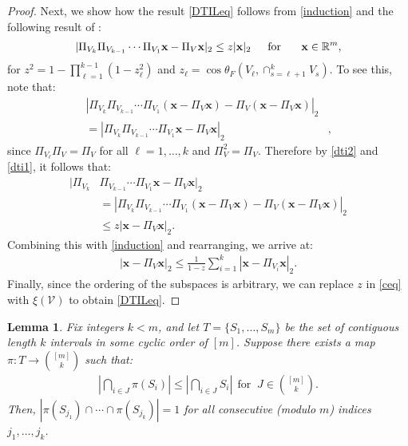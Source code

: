 \documentclass[journal, twocolumn]{IEEEtran}
\newtheorem{lemma}{Lemma}
\begin{document}
\begin{proof}
Next, we show how the result \eqref{DTILeq} follows from \eqref{induction} and the following result of \cite[Thm.~9.33]{Deutsch12}:
\begin{align}\label{dti2}
|\Pi_{V_k}\Pi_{V_{k-1}}\cdots\Pi_{V_1} \mathbf{x} - \Pi_V\mathbf{x}|_2 \leq z |\mathbf{x}|_2 \indent \text{for } \indent \mathbf{x} \in \mathbb{R}^m,
\end{align}
for \mbox{$z^2= 1 - \prod_{\ell =1}^{k-1}(1-z_{\ell}^2)$} and \mbox{$z_{\ell} = \cos\theta_F\left(V_{\ell}, \cap_{s=\ell+1}^k V_s\right)$}. 
To see this, note that:
\begin{align}\label{dti1}
|\Pi_{V_k}\Pi_{V_{k-1}}\cdots\Pi_{V_1}(\mathbf{x} - \Pi_V\mathbf{x}) - \Pi_V(\mathbf{x} - \Pi_V\mathbf{x})|_2& \\
= |\Pi_{V_k}\Pi_{V_{k-1}}\cdots\Pi_{V_1} \mathbf{x} - \Pi_V \mathbf{x} |_2&,
\end{align}
since $\Pi_{V_\ell} \Pi_V = \Pi_V$ for all $\ell = 1, \ldots, k$ and $\Pi_V^2 = \Pi_V$.
Therefore by \eqref{dti2} and \eqref{dti1}, it follows that:
\begin{align*}
|\Pi_{V_k}&\Pi_{V_{k-1}}\cdots\Pi_{V_1} \mathbf{x} - \Pi_V \mathbf{x} |_2 \\
&= |\Pi_{V_k}\Pi_{V_{k-1}}\cdots\Pi_{V_1}(\mathbf{x} - \Pi_V\mathbf{x}) - \Pi_V(\mathbf{x} - \Pi_V\mathbf{x})|_2 \\
&\leq z |\mathbf{x} - \Pi_V\mathbf{x}|_2.
\end{align*}
Combining this with \eqref{induction} and rearranging, we arrive at:
\begin{align}\label{ceq}
|\mathbf{x} - \Pi_V \mathbf{x}|_2 \leq \frac{1}{1 - z} \sum_{i=1}^k |\mathbf{x} - \Pi_{V_i} \mathbf{x}|_2.
\end{align}
Finally, since the ordering of the subspaces is arbitrary, we can replace $z$ in \eqref{ceq} with $\xi(\mathcal{V})$ to obtain \eqref{DTILeq}.
\end{proof}


\begin{lemma}\label{NonEmptyLemma} Fix integers $k < m$, and let $T = \{S_1, \ldots, S_m\}$ be the set of contiguous length $k$ intervals in some cyclic order of $[m]$. Suppose there exists a map $\pi: T \to {[m] \choose k}$ such that:
\begin{align}\label{NonEmpty}
|\bigcap_{i \in J} \pi(S_i)| \leq |\bigcap_{i \in J} S_i | \ \ \text{for } \ J \in {[m] \choose k}.
\end{align}
%
Then, $|\pi(S_{j_1}) \cap \cdots \cap \pi(S_{j_k})| = 1$ for all consecutive (modulo $m$) indices $j_1,\ldots,j_k$.
\end{lemma}
\end{document}
